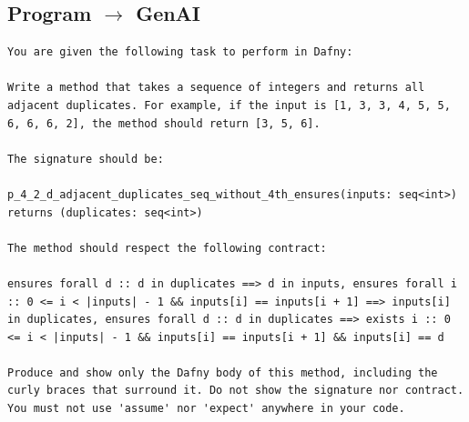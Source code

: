 \documentclass{article}
\begin{document}
\subsection*{Program $\rightarrow$ GenAI}
\begin{lstlisting}
You are given the following task to perform in Dafny:

Write a method that takes a sequence of integers and returns all adjacent duplicates. For example, if the input is [1, 3, 3, 4, 5, 5, 6, 6, 6, 2], the method should return [3, 5, 6].

The signature should be:

p_4_2_d_adjacent_duplicates_seq_without_4th_ensures(inputs: seq<int>) returns (duplicates: seq<int>)

The method should respect the following contract:

ensures forall d :: d in duplicates ==> d in inputs, ensures forall i :: 0 <= i < |inputs| - 1 && inputs[i] == inputs[i + 1] ==> inputs[i] in duplicates, ensures forall d :: d in duplicates ==> exists i :: 0 <= i < |inputs| - 1 && inputs[i] == inputs[i + 1] && inputs[i] == d

Produce and show only the Dafny body of this method, including the curly braces that surround it. Do not show the signature nor contract. You must not use 'assume' nor 'expect' anywhere in your code.
\end{lstlisting}
\end{document}
